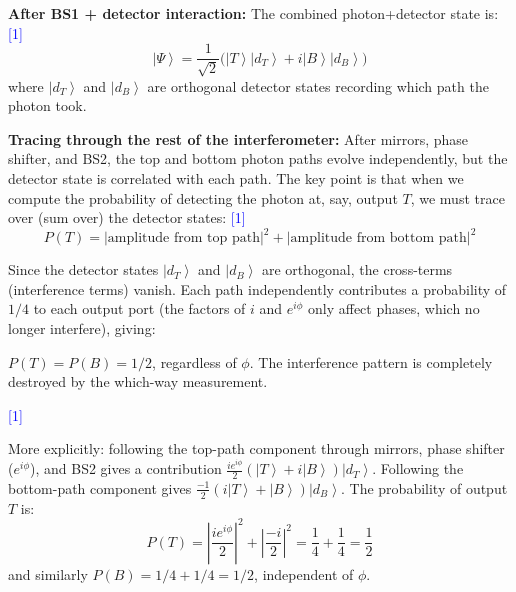 \documentclass[12pt,a4paper]{article}
\newcommand{\markstep}[1]{\hfill\textcolor{blue}{[#1]}}
\newcommand{\finalanswer}[1]{%
  \begin{tcolorbox}[colback=green!5!white,colframe=green!50!black,boxrule=0.5pt]
  #1
  \end{tcolorbox}
}
\renewcommand{\ket}[1]{\left|#1\right\rangle}
\begin{document}
\begin{parts}
\textbf{After BS1 + detector interaction:} The combined photon+detector state is: \markstep{1}
\[
\ket{\Psi} = \frac{1}{\sqrt{2}}\bigl(\ket{T}\ket{d_T} + i\ket{B}\ket{d_B}\bigr)
\]
where $\ket{d_T}$ and $\ket{d_B}$ are orthogonal detector states recording which path the photon took.

\textbf{Tracing through the rest of the interferometer:} After mirrors, phase shifter, and BS2, the top and bottom photon paths evolve independently, but the detector state is correlated with each path. The key point is that when we compute the probability of detecting the photon at, say, output $T$, we must trace over (sum over) the detector states: \markstep{1}
\[
P(T) = |\text{amplitude from top path}|^2 + |\text{amplitude from bottom path}|^2
\]

Since the detector states $\ket{d_T}$ and $\ket{d_B}$ are orthogonal, the cross-terms (interference terms) vanish. Each path independently contributes a probability of $1/4$ to each output port (the factors of $i$ and $e^{i\phi}$ only affect phases, which no longer interfere), giving:

\finalanswer{$P(T) = P(B) = 1/2$, regardless of $\phi$. The interference pattern is completely destroyed by the which-way measurement.}
\markstep{1}

More explicitly: following the top-path component through mirrors, phase shifter ($e^{i\phi}$), and BS2 gives a contribution $\frac{i e^{i\phi}}{2}(\ket{T}+i\ket{B})\ket{d_T}$. Following the bottom-path component gives $\frac{-1}{2}(i\ket{T}+\ket{B})\ket{d_B}$. The probability of output $T$ is:
\[
P(T) = \left|\frac{ie^{i\phi}}{2}\right|^2 + \left|\frac{-i}{2}\right|^2 = \frac{1}{4} + \frac{1}{4} = \frac{1}{2}
\]
and similarly $P(B) = 1/4 + 1/4 = 1/2$, independent of $\phi$.

\end{parts}
\end{document}
